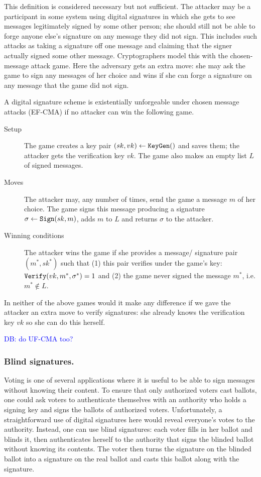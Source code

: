 \documentclass{llncs}
\newcommand{\alg}[1]{\textup{\texttt{#1}}}
\begin{document}
This definition is considered necessary but not sufficient. The attacker may be
a participant in some system using digital signatures in which she gets to see
messages legitimately signed by some other person; she should still not be able
to forge anyone else's signature on any message they did not sign. This includes
such attacks as taking a signature off one message and claiming that the signer
actually signed some other message. Cryptographers model this with the chosen-
message attack game. Here the adversary gets an extra move: she may ask the game
to sign any messages of her choice and wins if she can forge a signature on any
message that the game did not sign.

\begin{definition}
A digital signature scheme is existentially unforgeable under chosen message
attacks (EF-CMA) if no attacker can win the following game.

\begin{description}
\item[Setup] The game creates a key pair $(sk, vk) \gets \alg{KeyGen}()$ and
saves them; the attacker gets the verification key $vk$. The game also makes an
empty list $L$ of signed messages.

\item[Moves] The attacker may, any number of times, send the game a message $m$
of her choice. The game signs this message producing a signature $\sigma \gets
\alg{Sign}(sk, m)$, adds $m$ to $L$ and returns $\sigma$ to the attacker.

\item[Winning conditions] The attacker wins the game if she provides a message/
signature pair $(m^*, sk^*)$ such that (1) this pair verifies under the game's
key: $\alg{Verify}(vk, m^*, \sigma^*) = 1$ and (2) the game never signed the
message $m^*$, i.e. $m^* \notin L$.
\end{description}
\end{definition}

In neither of the above games would it make any difference if we gave the
attacker an extra move to verify signatures: she already knows the verification
key $vk$ so she can do this herself.

\textcolor{blue}{DB: do UF-CMA too?}

\subsubsection{Blind signatures.}
Voting is one of several applications where it is useful to be able to sign
messages without knowing their content. To ensure that only authorized voters
cast ballots, one could ask voters to authenticate themselves with an authority
who holds a signing key and signs the ballots of authorized voters.
Unfortunately, a straightforward use of digital signatures here would reveal
everyone's votes to the authority. Instead, one can use blind signatures: each
voter fills in her ballot and blinds it, then authenticates herself to the
authority that signs the blinded ballot without knowing its contents. The voter
then turns the signature on the blinded ballot into a signature on the real
ballot and casts this ballot along with the signature.
\end{document}
